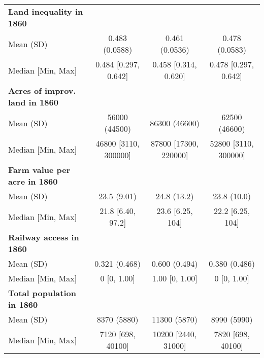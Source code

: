\begin{table}[h]
\begin{tabular}[t]{>{}lccc}
\addlinespace
\textbf{Land inequality in 1860} &  &  & \\
Mean (SD) & 0.483 (0.0588) & 0.461 (0.0536) & 0.478 (0.0583)\\
Median [Min, Max] & 0.484 [0.297, 0.642] & 0.458 [0.314, 0.620] & 0.478 [0.297, 0.642]\\
\addlinespace
\textbf{Acres of improv. land in 1860} &  &  & \\
Mean (SD) & 56000 (44500) & 86300 (46600) & 62500 (46600)\\
Median [Min, Max] & 46800 [3110, 300000] & 87800 [17300, 220000] & 52800 [3110, 300000]\\
\addlinespace
\textbf{Farm value per acre in 1860} &  &  & \\
Mean (SD) & 23.5 (9.01) & 24.8 (13.2) & 23.8 (10.0)\\
Median [Min, Max] & 21.8 [6.40, 97.2] & 23.6 [6.25, 104] & 22.2 [6.25, 104]\\
\addlinespace
\textbf{Railway access in 1860} &  &  & \\
Mean (SD) & 0.321 (0.468) & 0.600 (0.494) & 0.380 (0.486)\\
Median [Min, Max] & 0 [0, 1.00] & 1.00 [0, 1.00] & 0 [0, 1.00]\\
\addlinespace
\textbf{Total population in 1860} &  &  & \\
Mean (SD) & 8370 (5880) & 11300 (5870) & 8990 (5990)\\
Median [Min, Max] & 7120 [698, 40100] & 10200 [2440, 31000] & 7820 [698, 40100]\\
\bottomrule
\end{tabular}
\end{table}
